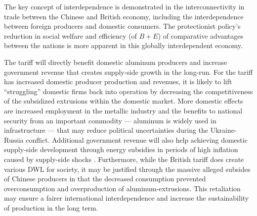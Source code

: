 \documentclass[a4paper,12pt]{article}
\begin{document}
The key concept of interdependence is demonstrated in the interconnectivity in trade between the Chinese and British economy, including the interdependence between foreign producers and domestic consumers. The protectionist policy's reduction in social welfare and efficiency (of $B+E$) of comparative advantages between the nations is more apparent in this globally interdependent economy.


The tariff will directly benefit domestic aluminum producers and increase government revenue that creates supply-side growth in the long-run. For the tariff has increased domestic producer production and revenues, it is likely to lift ``struggling'' domestic firms back into operation by decreasing the competitiveness of the subsidized extrusions within the domestic market. More domestic effects are increased employment in the metallic industry and the benefits to national security from an important commodity --- aluminum is widely used in infrastructure --- that may reduce political uncertainties during the Ukraine-Russia conflict. Additional government revenue will also help achieving domestic supply-side development through energy subsidies in periods of high inflation caused by supply-side shocks \parencite{seckute_2022}. Furthermore, while the British tariff does create various DWL for society, it may be justified through the massive alleged subsides of Chinese producers in that the decreased consumption prevented overconsumption and overproduction of aluminum-extrusions. This retaliation may ensure a fairer international interdependence and increase the sustainability of production in the long term.
\end{document}
